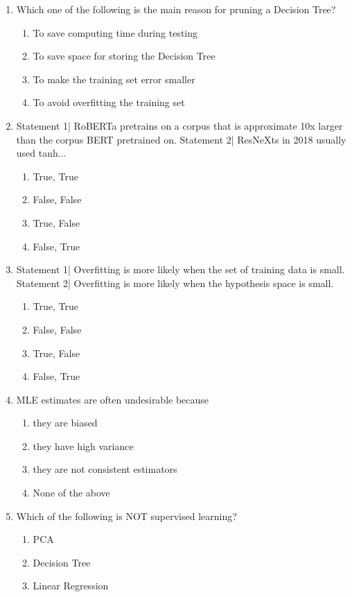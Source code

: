 \documentclass[{\csname fa0013Font0\endcsname\char"0030}{\csname fa0014Font0\endcsname\char"0033}pt]{article}
\begin{document}
\begin{enumerate}[label=\arabic*.]
\item Which one of the following is the main reason for pruning a Decision Tree?
\begin{enumerate}[label=(\alph*)]
    \item To save computing time during testing
    \item To save space for storing the Decision Tree
    \item To make the training set error smaller
    \item To avoid overfitting the training set
\end{enumerate}
\item Statement 1| RoBERTa pretrains on a corpus that is approximate 10x larger than the corpus BERT pretrained on. Statement 2| ResNeXts in 2018 usually used tanh...
\begin{enumerate}[label=(\alph*)]
    \item True, True
    \item False, False
    \item True, False
    \item False, True
\end{enumerate}
\item Statement 1| Overfitting is more likely when the set of training data is small. Statement 2| Overfitting is more likely when the hypothesis space is small.
\begin{enumerate}[label=(\alph*)]
    \item True, True
    \item False, False
    \item True, False
    \item False, True
\end{enumerate}
\item MLE estimates are often undesirable because
\begin{enumerate}[label=(\alph*)]
    \item they are biased
    \item they have high variance
    \item they are not consistent estimators
    \item None of the above
\end{enumerate}
\item Which of the following is NOT supervised learning?
\begin{enumerate}[label=(\alph*)]
    \item PCA
    \item Decision Tree
    \item Linear Regression

\end{enumerate}
\end{enumerate}
\end{document}
